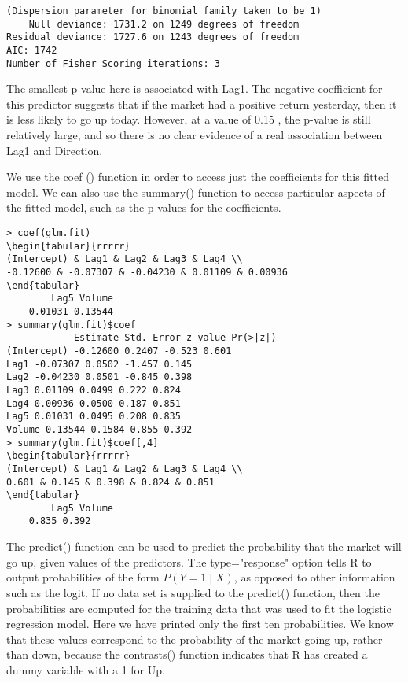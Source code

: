 \documentclass[10pt]{article}
\begin{document}
\begin{verbatim}
(Dispersion parameter for binomial family taken to be 1)
    Null deviance: 1731.2 on 1249 degrees of freedom
Residual deviance: 1727.6 on 1243 degrees of freedom
AIC: 1742
Number of Fisher Scoring iterations: 3
\end{verbatim}

The smallest p-value here is associated with Lag1. The negative coefficient for this predictor suggests that if the market had a positive return yesterday, then it is less likely to go up today. However, at a value of 0.15 , the p-value is still relatively large, and so there is no clear evidence of a real association between Lag1 and Direction.

We use the coef () function in order to access just the coefficients for this fitted model. We can also use the summary() function to access particular aspects of the fitted model, such as the p-values for the coefficients.

\begin{verbatim}
> coef(glm.fit)
\begin{tabular}{rrrrr} 
(Intercept) & Lag1 & Lag2 & Lag3 & Lag4 \\
-0.12600 & -0.07307 & -0.04230 & 0.01109 & 0.00936
\end{tabular}
        Lag5 Volume
    0.01031 0.13544
> summary(glm.fit)$coef
            Estimate Std. Error z value Pr(>|z|)
(Intercept) -0.12600 0.2407 -0.523 0.601
Lag1 -0.07307 0.0502 -1.457 0.145
Lag2 -0.04230 0.0501 -0.845 0.398
Lag3 0.01109 0.0499 0.222 0.824
Lag4 0.00936 0.0500 0.187 0.851
Lag5 0.01031 0.0495 0.208 0.835
Volume 0.13544 0.1584 0.855 0.392
> summary(glm.fit)$coef[,4]
\begin{tabular}{rrrrr} 
(Intercept) & Lag1 & Lag2 & Lag3 & Lag4 \\
0.601 & 0.145 & 0.398 & 0.824 & 0.851
\end{tabular}
        Lag5 Volume
    0.835 0.392
\end{verbatim}

The predict() function can be used to predict the probability that the market will go up, given values of the predictors. The type="response" option tells R to output probabilities of the form $P(Y=1 \mid X)$, as opposed to other information such as the logit. If no data set is supplied to the predict() function, then the probabilities are computed for the training data that was used to fit the logistic regression model. Here we have printed only the first ten probabilities. We know that these values correspond to the probability of the market going up, rather than down, because the contrasts() function indicates that R has created a dummy variable with a 1 for Up.
\end{document}
